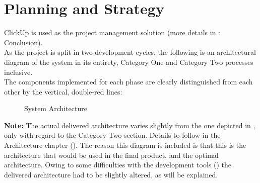 \section{Planning and Strategy}
ClickUp \autocite{ClickUpOneApp} is used as the project management solution (more details in : Conclusion).\\
As the project is split in two development cycles, the following is an architectural diagram
of the system in its entirety, Category One and Category Two processes inclusive.\\
The components implemented for each phase are clearly distinguished from each other by the vertical, double-red lines:
\begin{figure}[H]
	\centering
	\caption[System Architecture]{System Architecture}
	\label{fig:sys_archi}
\end{figure}
\textbf{Note:} The actual delivered architecture varies slightly from the one depicted in , only with regard to the Category Two section.
Details to follow in the Architecture chapter ().
The reason this diagram is included is that this is the architecture that would be used in the final product, and the optimal architecture. Owing to some
difficulties with the development tools () the delivered architecture had to be slightly altered, as will be explained.






